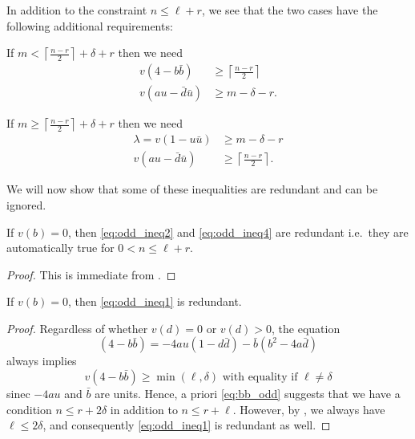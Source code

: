 In addition to the constraint $n \le \ell + r$,
we see that the two cases have the following additional requirements:
\begin{description}
  \ii[Case 1] If $m < \left\lceil \frac{n-r}{2} \right\rceil + \delta + r$ then we need
  \begin{align}
    v(4-b\bar b) &\ge \left\lceil \frac{n-r}{2} \right\rceil \label{eq:odd_ineq1} \\
    v(au - \bar d \bar u) &\ge m - \delta - r \label{eq:odd_ineq2}.
  \end{align}

  \ii[Case 2] If $m \geq \left\lceil \frac{n-r}{2} \right\rceil + \delta + r$ then we need
  \begin{align}
    \lambda = v(1-u \bar u) &\ge m-\delta-r \label{eq:odd_ineq3} \\
    v(au - \bar d \bar u) &\ge \left\lceil \frac{n-r}{2} \right\rceil \label{eq:odd_ineq4}.
  \end{align}
\end{description}

We will now show that some of these inequalities are redundant and can be ignored.
\begin{lemma}
  If $v(b) = 0$, then \eqref{eq:odd_ineq2} and \eqref{eq:odd_ineq4} are redundant
  i.e.\ they are automatically true for $0 < n \le \ell + r$.
\end{lemma}
\begin{proof}
  This is immediate from .
\end{proof}

\begin{lemma}
  If $v(b) = 0$, then \eqref{eq:odd_ineq1} is redundant.
\end{lemma}
\begin{proof}
  Regardless of whether $v(d) = 0$ or $v(d) > 0$, the equation
  \[ (4-b \bar b) = -4au(1-d\bar d) - \bar b(b^2-4a\bar d) \]
  always implies
  \begin{equation}
    v(4-b\bar b) \ge \min(\ell,\delta) \text{ with equality if } \ell \neq \delta
    \label{eq:bb_odd}
  \end{equation}
  sinec $-4au$ and $\bar b$ are units.
  Hence, a priori \eqref{eq:bb_odd} suggests that we have a condition
  $n \le r + 2 \delta$ in addition to $n \le r + \ell$.
  However, by , we always have $\ell \le 2 \delta$,
  and consequently \eqref{eq:odd_ineq1} is redundant as well.
\end{proof}

